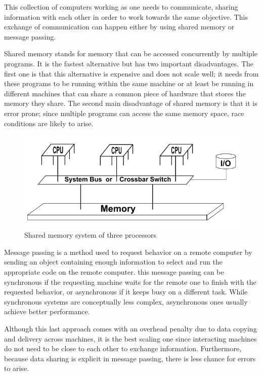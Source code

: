 This collection of computers working as one needs to communicate, sharing information with each other in order to work towards the same objective. This exchange of communication can happen either by using shared memory or message passing.

Shared memory stands for memory that can be accessed concurrently by multiple programs. It is the fastest alternative but has two important disadvantages. The first one is that this alternative is expensive and does not scale well; it needs from these programs to be running within the same machine or at least be running in different machines that can share a common piece of hardware that stores the memory they share. The second main disadvantage of shared memory is that it is error prone; since multiple programs can access the same memory space, race conditions are likely to arise.

\begin{figure}[h!]
\centering
    \includegraphics[scale=0.6]{assets/images/shared_memory.png}
    \caption{Shared memory system of three processors}
    \label{fig:shared_memory}
\end{figure}

\newpage
Message passing is a method used to request behavior on a remote computer by sending an object containing enough information to select and run the appropriate code on the remote computer. this message passing can be synchronous if the requesting machine waits for the remote one to finish with the requested behavior, or asynchronous if it keeps busy on a different task. While synchronous systems are conceptually less complex, asynchronous ones usually achieve better performance.

Although this last approach comes with an overhead penalty due to data copying and delivery across machines, it is the best scaling one since interacting machines do not need to be close to each other to exchange information. Furthermore, because data sharing is explicit in message passing, there is less chance for errors to arise. 

